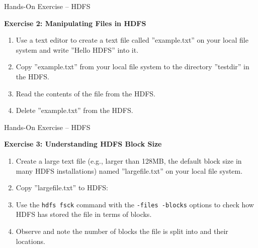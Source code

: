 \documentclass[ignorenonframetext,xcolor=x11names]{beamer}
\begin{document}
\begin{frame}{Hands-On Exercise -- HDFS} 

\textbf{Exercise 2: Manipulating Files in HDFS}

\begin{enumerate}
  \item Use a text editor to create a text file called ''example.txt'' on your local file system and write ''Hello HDFS'' into it.
  \item Copy ''example.txt'' from your local file system to the directory ''testdir'' in the HDFS.
  \item Read the contents of the file from the HDFS.
  \item Delete ''example.txt'' from the HDFS.
\end{enumerate}
\end{frame}

\begin{frame}{Hands-On Exercise -- HDFS} 

\textbf{Exercise 3: Understanding HDFS Block Size}

\begin{enumerate}
  \item Create a large text file (e.g., larger than 128MB, the default block size in many HDFS installations) named ''largefile.txt'' on your local file system.
  \item Copy ''largefile.txt'' to HDFS:
  \item Use the \texttt{hdfs fsck} command with the \texttt{-files -blocks} options to check how HDFS has stored the file in terms of blocks.
  \item Observe and note the number of blocks the file is split into and their locations.
\end{enumerate}
\end{frame}
\end{document}
